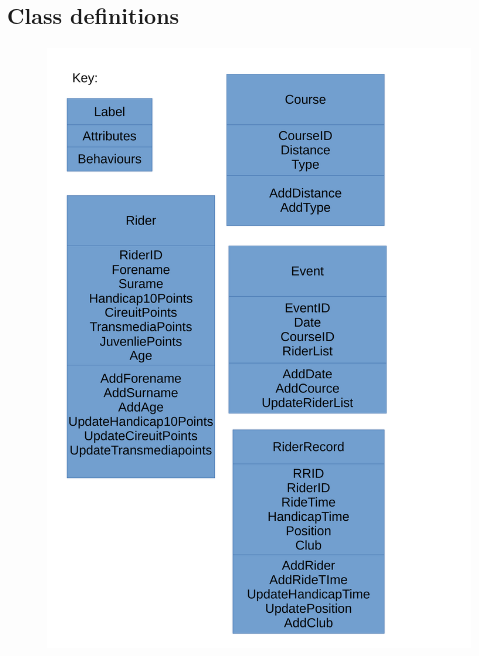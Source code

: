 \subsection{Class definitions}
\begin{figure}[H]

	\includegraphics[width=\textwidth]{./Class.pdf}


\end{figure}
